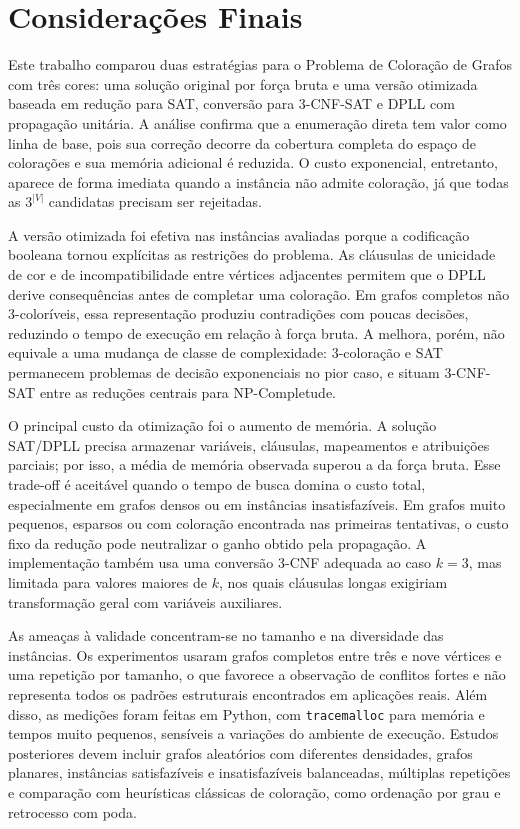 \section{Considerações Finais}\label{sec:consideracoesFinais}

Este trabalho comparou duas estratégias para o Problema de Coloração de Grafos com três cores: uma solução original por força bruta e uma versão otimizada baseada em redução para SAT, conversão para 3-CNF-SAT e DPLL com propagação unitária. A análise confirma que a enumeração direta tem valor como linha de base, pois sua correção decorre da cobertura completa do espaço de colorações e sua memória adicional é reduzida. O custo exponencial, entretanto, aparece de forma imediata quando a instância não admite coloração, já que todas as $3^{|V|}$ candidatas precisam ser rejeitadas.

A versão otimizada foi efetiva nas instâncias avaliadas porque a codificação booleana tornou explícitas as restrições do problema. As cláusulas de unicidade de cor e de incompatibilidade entre vértices adjacentes permitem que o DPLL derive consequências antes de completar uma coloração. Em grafos completos não 3-coloríveis, essa representação produziu contradições com poucas decisões, reduzindo o tempo de execução em relação à força bruta. A melhora, porém, não equivale a uma mudança de classe de complexidade: 3-coloração e SAT permanecem problemas de decisão exponenciais no pior caso, e \textcite{Silva2026PAA13} situam 3-CNF-SAT entre as reduções centrais para NP-Completude.

O principal custo da otimização foi o aumento de memória. A solução SAT/DPLL precisa armazenar variáveis, cláusulas, mapeamentos e atribuições parciais; por isso, a média de memória observada superou a da força bruta. Esse trade-off é aceitável quando o tempo de busca domina o custo total, especialmente em grafos densos ou em instâncias insatisfazíveis. Em grafos muito pequenos, esparsos ou com coloração encontrada nas primeiras tentativas, o custo fixo da redução pode neutralizar o ganho obtido pela propagação. A implementação também usa uma conversão 3-CNF adequada ao caso $k=3$, mas limitada para valores maiores de $k$, nos quais cláusulas longas exigiriam transformação geral com variáveis auxiliares.

As ameaças à validade concentram-se no tamanho e na diversidade das instâncias. Os experimentos usaram grafos completos entre três e nove vértices e uma repetição por tamanho, o que favorece a observação de conflitos fortes e não representa todos os padrões estruturais encontrados em aplicações reais. Além disso, as medições foram feitas em Python, com \texttt{tracemalloc} para memória e tempos muito pequenos, sensíveis a variações do ambiente de execução. Estudos posteriores devem incluir grafos aleatórios com diferentes densidades, grafos planares, instâncias satisfazíveis e insatisfazíveis balanceadas, múltiplas repetições e comparação com heurísticas clássicas de coloração, como ordenação por grau e retrocesso com poda.


